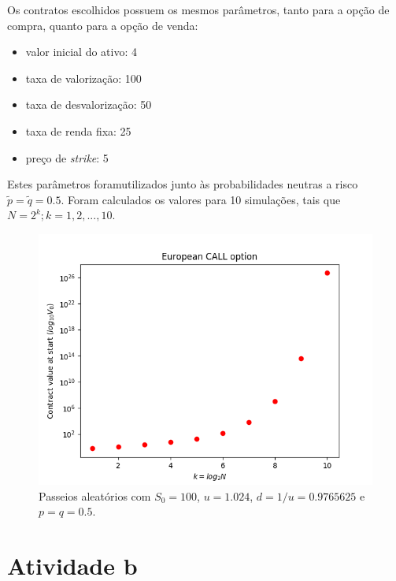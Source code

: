 \documentclass{article}
\begin{document}
Os contratos escolhidos possuem os mesmos parâmetros, tanto para a opção de compra, quanto para a opção de venda:

\begin{itemize}
	\item valor inicial do ativo: 4
	\item taxa de valorização: 100%
	\item taxa de desvalorização: 50%
	\item taxa de renda fixa: 25%
	\item preço de \emph{strike}: 5
\end{itemize}

Estes parâmetros foramutilizados junto às probabilidades neutras a risco $\tilde{p} = \tilde{q} = 0.5$.
Foram calculados os valores para 10 simulações, tais que $N = 2^{k}; k = 1, 2, ..., 10$.



\begin{figure}[]
	\includegraphics[width=\linewidth]{Figure_1.png}
	\centering
	
	\caption{Passeios aleatórios com $S_{0} = 100$, $u = 1.024$, $d = 1/u = 0.9765625$ e $p = q = 0.5$.}
	\label{}
\end{figure}



\section*{Atividade b}
\end{document}

